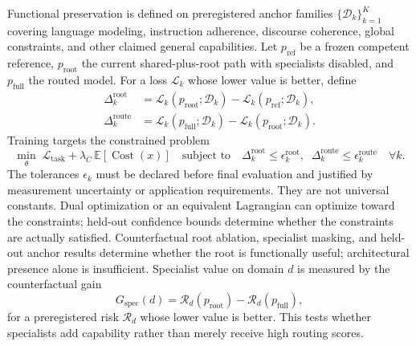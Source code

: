 \documentclass[10pt,a4paper]{article}
\newcommand{\op}[1]{\operatorname{#1}}
\newcommand{\eps}{\epsilon}
\newcommand{\Lcal}{\mathcal{L}}
\newcommand{\Dcal}{\mathcal{D}}
\newcommand{\Rcal}{\mathcal{R}}
\newcommand{\E}{\mathbb{E}}
\begin{document}
Functional preservation is defined on preregistered anchor families
$\{\Dcal_k\}_{k=1}^{K}$ covering language modeling, instruction adherence,
discourse coherence, global constraints, and other claimed general
capabilities. Let $p_{\mathrm{ref}}$ be a frozen competent reference,
$p_{\mathrm{root}}$ the current shared-plus-root path with specialists
disabled, and $p_{\mathrm{full}}$ the routed model. For a loss $\Lcal_k$ whose
lower value is better, define
\begin{align}
\Delta^{\mathrm{root}}_k &= \Lcal_k(p_{\mathrm{root}}; \Dcal_k)
  - \Lcal_k(p_{\mathrm{ref}}; \Dcal_k), \\
\Delta^{\mathrm{route}}_k &= \Lcal_k(p_{\mathrm{full}}; \Dcal_k)
  - \Lcal_k(p_{\mathrm{root}}; \Dcal_k).
\label{eq:routegap}
\end{align}
Training targets the constrained problem
\begin{equation}
\min_\theta\; \Lcal_{\mathrm{task}} + \lambda_C\, \E[\op{Cost}(x)]
\quad \text{subject to} \quad
\Delta^{\mathrm{root}}_k \le \eps^{\mathrm{root}}_k, \;\;
\Delta^{\mathrm{route}}_k \le \eps^{\mathrm{route}}_k \quad \forall k.
\label{eq:constrained}
\end{equation}
The tolerances $\eps_k$ must be declared before final evaluation and justified
by measurement uncertainty or application requirements. They are not universal
constants. Dual optimization or an equivalent Lagrangian can optimize toward
the constraints; held-out confidence bounds determine whether the constraints
are actually satisfied. Counterfactual root ablation, specialist masking, and
held-out anchor results determine whether the root is functionally useful;
architectural presence alone is insufficient. Specialist value on domain $d$
is measured by the counterfactual gain
\begin{equation}
G_{\mathrm{spec}}(d) = \Rcal_d(p_{\mathrm{root}}) - \Rcal_d(p_{\mathrm{full}}),
\end{equation}
for a preregistered risk $\Rcal_d$ whose lower value is better. This tests
whether specialists add capability rather than merely receive high routing
scores.
\end{document}
